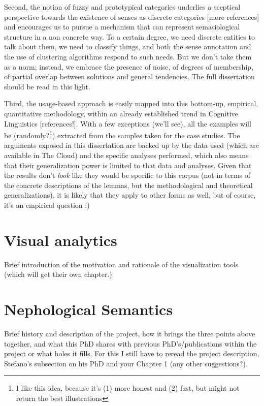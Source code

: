 \documentclass[
]{book}
\begin{document}
Second, the notion of fuzzy and prototypical categories underlies a sceptical perspective towards the existence of senses
as discrete categories {[}more references{]} and encourages us to pursue a mechanism that can represent semasiological structure
in a non concrete way. To a certain degree, we need discrete entities to talk about them, we need to classify things,
and both the sense annotation and the use of clustering algorithms respond to such needs. But we don't take them as a norm; instead,
we embrace the presence of noise, of degrees of membership, of partial overlap between solutions and general tendencies.
The full dissertation should be read in this light.

Third, the usage-based approach is easily mapped into this bottom-up, empirical, quantitative methodology,
within an already established trend in Cognitive Linguistics {[}references!{]}. With a few exceptions (we'll see),
all the examples will be (randomly?\footnote{I like this idea, because it's (1) more honest and (2) fast, but might not return the best illustrations}) extracted from the samples taken for the case studies. The arguments exposed in this
dissertation are backed up by the data used (which are available in The Cloud) and the specific analyses performed,
which also means that their generalization power is limited to that data and analyses.
Given that the results don't \emph{look} like they would be specific to this corpus (not in terms of the concrete descriptions of the lemmas,
but the methodological and theoretical generalizations), it is likely that they apply to other forms as well, but of course,
it's an empirical question :)

\hypertarget{viz}{%
\section{Visual analytics}\label{viz}}

Brief introduction of the motivation and rationale of the visualization tools (which will get their own chapter.)

\hypertarget{nephosem}{%
\section{Nephological Semantics}\label{nephosem}}

Brief history and description of the project, how it brings the three points above together,
and what this PhD shares with previous PhD's/publications within the project or what holes it fills.
For this I still have to reread the project description, Stefano's subsection on his PhD and your Chapter 1 (any other suggestions?).
\end{document}
